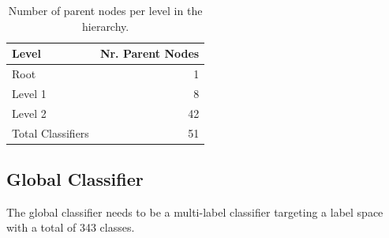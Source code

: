 \documentclass[11pt,a4paper]{article}
\begin{document}
\begin{table}[!h]
\begin{center}
\begin{tabular}{|l|r|}
\hline\centering\textbf{Level}  &  \textbf{Nr. Parent Nodes}    \\
\hline
Root              &  1       \\
Level 1           &  8       \\
Level 2           &  42      \\
\hline
Total Classifiers & 51       \\
\hline
\end{tabular}
\end{center}
\caption{\label{parent-per-node-classifiers}Number of parent nodes per level in the hierarchy.}
\end{table}



\subsection{Global Classifier}

The global classifier needs to be a multi-label classifier targeting a label
space with a total of 343 classes.

\end{document}
